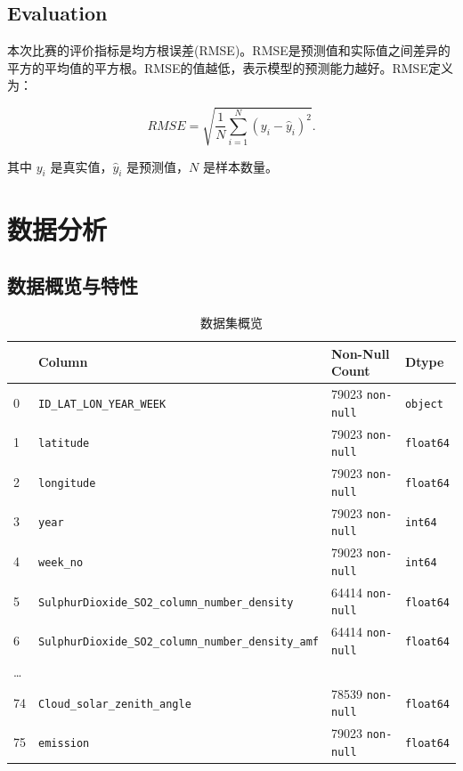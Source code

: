 \documentclass{ctexart}
\begin{document}
\subsection{Evaluation}

本次比赛的评价指标是均方根误差(RMSE)。RMSE是预测值和实际值之间差异的平方的平均值的平方根。RMSE的值越低，表示模型的预测能力越好。RMSE定义为：

\[
    RMSE=\sqrt{\frac{1}{N}\sum\limits_{i=1}^{N}(y_i-\hat y_i)^2}.
\]

其中 $y_i$ 是真实值，$\hat y_i$ 是预测值，$N$ 是样本数量。

\section{数据分析}

\subsection{数据概览与特性}

\begin{table}[h]
      \centering
      \begin{tabular}{l|l|l|l}
      \hline
          \ & Column & Non-Null Count & Dtype \\ \hline
          0 & \texttt{ID\_LAT\_LON\_YEAR\_WEEK} & 79023 \texttt{non-null} &
          \texttt{object} \\
          1 & \texttt{latitude} & 79023 \texttt{non-null} & \texttt{float64} \\
          2 & \texttt{longitude} & 79023 \texttt{non-null} & \texttt{float64} \\
          3 & \texttt{year} & 79023 \texttt{non-null} & \texttt{int64} \\
          4 & \texttt{week\_no} & 79023 \texttt{non-null} & \texttt{int64} \\
          5 & \texttt{SulphurDioxide\_SO2\_column\_number\_density} & 64414
          \texttt{non-null} & \texttt{float64} \\
          6 & \texttt{SulphurDioxide\_SO2\_column\_number\_density\_amf} & 64414
          \texttt{non-null} & \texttt{float64} \\
          \ldots{} & & & \\
          74 & \texttt{Cloud\_solar\_zenith\_angle} & 78539 \texttt{non-null} &
          \texttt{float64} \\
          75 & \texttt{emission} & 79023 \texttt{non-null} & \texttt{float64} \\
          \hline
      \end{tabular}
      \caption{数据集概览}
\end{table}
\end{document}
